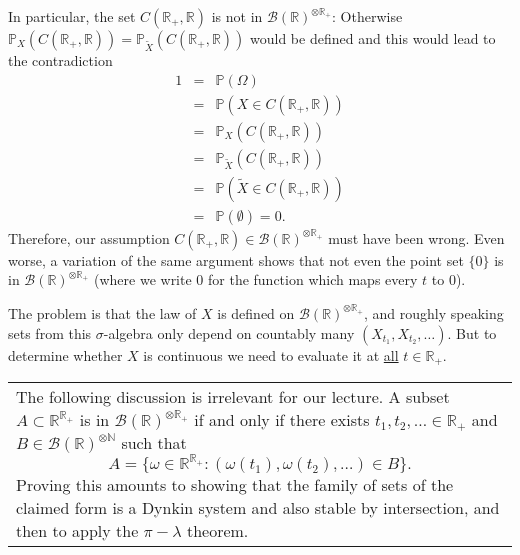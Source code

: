 \documentclass{article}
\newcommand{\tmtextbf}[1]{\text{{\bfseries{#1}}}}
\newcommand{\1}{\mathbbm{1}}
\begin{document}
\begin{example}
  In particular, the set $C (\mathbb{R}_+, \mathbb{R})$ is not in $\mathcal{B}
  (\mathbb{R})^{\otimes \mathbb{R}_+}$: Otherwise $\mathbb{P}_X (C
  (\mathbb{R}_+, \mathbb{R})) =\mathbb{P}_{\tilde{X}} (C (\mathbb{R}_+,
  \mathbb{R}))$ would be defined and this would lead to the contradiction
  \begin{eqnarray*}
    1 & = & \mathbb{P} (\Omega)\\
    & = & \mathbb{P} (X \in C (\mathbb{R}_+, \mathbb{R}))\\
    & = & \mathbb{P}_X (C (\mathbb{R}_+, \mathbb{R}))\\
    & = & \mathbb{P}_{\tilde{X}} (C (\mathbb{R}_+, \mathbb{R}))\\
    & = & \mathbb{P} (\tilde{X} \in C (\mathbb{R}_+, \mathbb{R}))\\
    & = & \mathbb{P} (\emptyset) = 0.
  \end{eqnarray*}
  Therefore, our assumption $C (\mathbb{R}_+, \mathbb{R}) \in \mathcal{B}
  (\mathbb{R})^{\otimes \mathbb{R}_+}$ must have been wrong. Even worse, a
  variation of the same argument shows that not even the point set $\{ 0 \}$
  is in $\mathcal{B} (\mathbb{R})^{\otimes \mathbb{R}_+}$ (where we write $0$
  for the function which maps every $t$ to $0$).
\end{example}

The problem is that the law of $X$ is defined on $\mathcal{B}
(\mathbb{R})^{\otimes \mathbb{R}_+}$, and roughly speaking sets from this
$\sigma$-algebra only depend on countably many $(X_{t_1}, X_{t_2}, \ldots)$.
But to determine whether $X$ is continuous we need to evaluate it at
{\underline{all}} $t \in \mathbb{R}_+$.

{\noindent}\begin{tabularx}{1.0\textwidth}{@{}X@{}}
  \tmtextbf{Structure of $\mathcal{B} (\mathbb{R})^{\otimes \mathbb{R}_+}$:}
  The following discussion is irrelevant for our lecture. A subset $A \subset
  \mathbb{R}^{\mathbb{R}_+}$ is in $\mathcal{B} (\mathbb{R})^{\otimes
  \mathbb{R}_+}$ if and only if there exists $t_1, t_2, \ldots \in
  \mathbb{R}_+$ and $B \in \mathcal{B} (\mathbb{R})^{\otimes \mathbb{N}}$ such
  that
  \[ A = \{ \omega \in \mathbb{R}^{\mathbb{R}_+} : (\omega (t_1), \omega
     (t_2), \ldots) \in B \} . \]
  Proving this amounts to showing that the family of sets of the claimed form
  is a Dynkin system and also stable by intersection, and then to apply the
  $\pi - \lambda$ theorem.
\end{tabularx}
\end{document}
